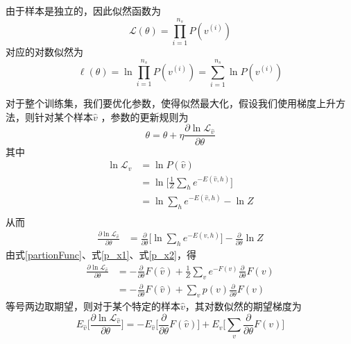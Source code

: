 由于样本是独立的，因此似然函数为
\begin{equation}
\mathcal{L}(\theta) = \prod\limits_{i=1}^{n_s}P(v^{(i)})
\end{equation}
对应的对数似然为
\begin{equation}
\ell(\theta) = \ln \prod\limits_{i=1}^{n_s}P(v^{(i)}) = \sum\limits_{i=1}^{n_s} \ln P(v^{(i)}) 
\end{equation}

对于整个训练集，我们要优化参数，使得似然最大化，假设我们使用梯度上升方法，则针对某个样本$\hat{v}$ ，参数的更新规则为
\begin{equation}
\theta = \theta + \eta \frac{\partial\ln\mathcal{L}_{\hat{v}} }{\partial\theta}
\end{equation}
其中
\begin{equation}
\begin{split}
\ln\mathcal{L}_{\hat{v}} & = \ln P(\hat{v})\\
&=\ln\Big[\frac{1}{Z} \sum\limits_h e^{-	E(\hat{v}, h)}\Big] \\
&= \ln\sum\limits_h e^{-	E(\hat{v}, h)} - \ln Z\\
\end{split}
\end{equation}
从而
\begin{equation}
\begin{split}
 \frac{\partial\ln\mathcal{L}_{\hat{v}} }{\partial\theta} 
 &=  \frac{\partial}{\partial\theta}\Big[ \ln\sum\limits_h e^{-	E(\hat{v}, h)} \Big] - 
 \frac{\partial}{\partial\theta}\ln Z
 \end{split}
\end{equation}
由式\eqref{partionFunc}、式\eqref{p_x1}、式\eqref{p_x2}，得
\begin{equation}\label{temp1}
\begin{split}
 \frac{\partial\ln\mathcal{L}_{\hat{v}} }{\partial\theta} 
 &=  - \frac{\partial}{\partial\theta}F(\hat{v}) + \frac{1}{Z} \sum\limits_{v}e^{-F(v)}  \frac{\partial}{\partial\theta}F(v) \\
 &=  - \frac{\partial}{\partial\theta}F(\hat{v}) + \sum\limits_{v} p(v) \frac{\partial}{\partial\theta}F(v)
 \end{split}
\end{equation}
\iffalse
等号两边取期望，则对于某个特定的样本$\hat{v}$，其对数似然的期望梯度为
\begin{equation}
E_{\hat{v}}\bigg[  \frac{\partial\ln\mathcal{L}_{\hat{v}} }{\partial\theta} \bigg]
=  - E_{\hat{v}} \bigg[ \frac{\partial}{\partial\theta}F(\hat{v}) \bigg] + 
E_{v}\bigg[ \sum\limits_{v}\frac{\partial}{\partial\theta}F(v)\bigg]
\end{equation}
